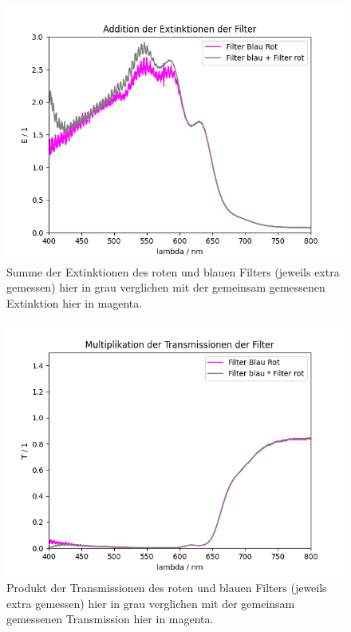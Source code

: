 \documentclass{article}
\begin{document}
\begin{figure}[H]
\centering
\caption{Summe der Extinktionen des roten und blauen Filters (jeweils extra gemessen) hier in grau verglichen mit der gemeinsam gemessenen Extinktion hier in magenta.}
\label{fig:sum_ext_1}
\includegraphics[scale=0.6]{FF_Extinktionen_addition_1.png}
\end{figure}




\begin{figure}[H]
\centering
\caption{Produkt der Transmissionen des roten und blauen Filters (jeweils extra gemessen) hier in grau verglichen mit der gemeinsam gemessenen Transmission hier in magenta.}
\label{fig:mult_trans_1}
\includegraphics[scale=0.6]{FF_Extinktionen_multiplikation_1.png}
\end{figure}
\end{document}
